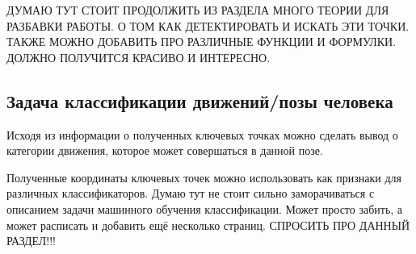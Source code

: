 ДУМАЮ ТУТ СТОИТ ПРОДОЛЖИТЬ ИЗ РАЗДЕЛА МНОГО ТЕОРИИ ДЛЯ РАЗБАВКИ РАБОТЫ. О ТОМ КАК ДЕТЕКТИРОВАТЬ И ИСКАТЬ ЭТИ ТОЧКИ. ТАКЖЕ МОЖНО ДОБАВИТЬ ПРО РАЗЛИЧНЫЕ ФУНКЦИИ И ФОРМУЛКИ. ДОЛЖНО ПОЛУЧИТСЯ КРАСИВО И ИНТЕРЕСНО.

\subsection{Задача классификации движений/позы человека}
\label{subsec:Theory of classification}

Исходя из информации о полученных ключевых точках можно сделать вывод о категории движения, которое может совершаться в данной позе.

Полученные координаты ключевых точек можно использовать как признаки для различных классификаторов. Думаю тут не стоит сильно заморачиваться с описанием задачи машинного обучения классификации. Может просто забить, а может расписать и добавить ещё несколько страниц. СПРОСИТЬ ПРО ДАННЫЙ РАЗДЕЛ!!!
\newpage